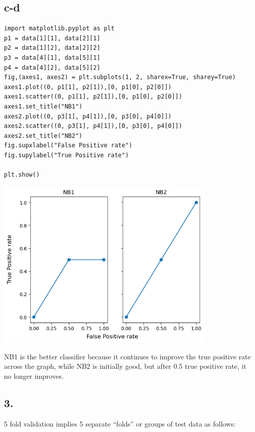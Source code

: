 \documentclass[11pt]{article}
\begin{document}
\subsection*{c-d}
\label{sec:orgb7e5b0e}
\begin{verbatim}
import matplotlib.pyplot as plt
p1 = data[1][1], data[2][1]
p2 = data[1][2], data[2][2]
p3 = data[4][1], data[5][1]
p4 = data[4][2], data[5][2]
fig,(axes1, axes2) = plt.subplots(1, 2, sharex=True, sharey=True)
axes1.plot((0, p1[1], p2[1]),[0, p1[0], p2[0]])
axes1.scatter((0, p1[1], p2[1]),[0, p1[0], p2[0]])
axes1.set_title("NB1")
axes2.plot((0, p3[1], p4[1]),[0, p3[0], p4[0]])
axes2.scatter((0, p3[1], p4[1]),[0, p3[0], p4[0]])
axes2.set_title("NB2")
fig.supxlabel("False Positive rate")
fig.supylabel("True Positive rate")

plt.show()
\end{verbatim}
\begin{center}
\includegraphics[width=0.8\textwidth]{./.ob-jupyter/e4ef7cede22065a8a8d63ee0061849500d831c04.png}
\end{center}

NB1 is the better classifier because it continues to improve the true
positive rate across the graph, while NB2 is initially good, but after 0.5
true positive rate, it no longer improves.

\subsection*{3.}
\label{sec:org1f36627}
5 fold validation implies 5 separate ``folds'' or groups of test data as follows:
\end{document}
